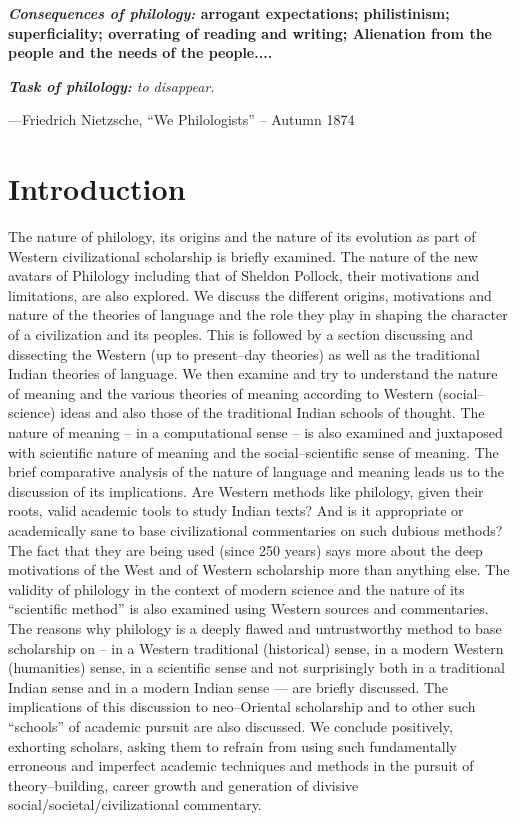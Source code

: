 \textbf{\textit{Consequences of philology:} arrogant expectations; philistinism; superficiality; overrating of reading and writing; Alienation from the people and the needs of the people.... }

\textit{\textbf{Task of philology:} to disappear.}

 —Friedrich Nietzsche, “We Philologists” – Autumn 1874


\section*{Introduction}

The nature of philology, its origins and the nature of its evolution as part of Western civilizational scholarship is briefly examined. The nature of the new avatars of Philology including that of Sheldon Pollock, their motivations and limitations, are also explored. We discuss the different origins, motivations and nature of the theories of language and the role they play in shaping the character of a civilization and its peoples. This is followed by a section discussing and dissecting the Western (up to present–day theories) as well as the traditional Indian theories of language. We then examine and try to understand the nature of meaning and the various theories of meaning according to Western (social–science) ideas and also those of the traditional Indian schools of thought. The nature of meaning – in a computational sense – is also examined and juxtaposed with scientific nature of meaning and the social–scientific sense of meaning. The brief comparative analysis of the nature of language and meaning leads us to the discussion of its implications. Are Western methods like philology, given their roots, valid academic tools to study Indian texts? And is it appropriate or academically sane to base civilizational commentaries on such dubious methods? The fact that they are being used (since 250 years) says more about the deep motivations of the West and of Western scholarship more than anything else. The validity of philology in the context of modern science and the nature of its “scientific method” is also examined using Western sources and commentaries. The reasons why philology is a deeply flawed and untrustworthy method to base scholarship on – in a Western traditional (historical) sense, in a modern Western (humanities) sense, in a scientific sense and not surprisingly both in a traditional Indian sense and in a modern Indian sense — are briefly discussed. The implications of this discussion to neo–Oriental scholarship and to other such “schools” of academic pursuit are also discussed. We conclude positively, exhorting scholars, asking them to refrain from using such fundamentally erroneous and imperfect academic techniques and methods in the pursuit of theory–building, career growth and generation of divisive social/societal/civilizational commentary.


